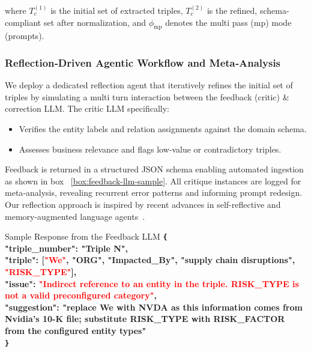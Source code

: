 where $T_c^{(1)}$ is the initial set of extracted triples, $T_c^{(2)}$ is the refined, schema-compliant set after normalization, and $\phi_{\mathrm{mp}}$ denotes the multi pass (mp) mode (prompts).

\subsubsection{Reflection‐Driven Agentic Workflow and Meta‐Analysis}
We deploy a dedicated reflection agent that iteratively refines the initial set of triples by simulating a multi turn interaction between the feedback (critic) \& correction LLM.
The critic LLM specifically: 
\begin{itemize}
  \item Verifies the entity labels and relation assignments against the domain schema.
  \item Assesses business relevance and flags low‐value or contradictory triples.
\end{itemize}
Feedback is returned in a structured JSON schema enabling automated ingestion as shown in box ~\ref{box:feedback-llm-sample}. All critique instances are logged for meta‐analysis, revealing recurrent error patterns and informing prompt redesign. Our reflection approach is inspired by recent advances in self-reflective and memory-augmented language agents~\cite{li2024reflexion,shinn2023reflexion}.\\


\begin{mybox}[label={box:feedback-llm-sample}]{Sample Response from the Feedback LLM}
\footnotesize
\textbf{\texttt{\{}
\\ \hspace{2mm} "triple\_number": "Triple N",
\\ \hspace{2mm} "triple": [\textcolor{red}{"We"}, "ORG", "Impacted\_By", "supply chain disruptions", \textcolor{red}{"RISK\_TYPE"}],
\\ \hspace{2mm} "issue": \textcolor{red}{"Indirect reference to an entity in the triple. RISK\_TYPE is not a valid preconfigured category"},
\\ \hspace{2mm} "suggestion": \textcolor{greenreference}{"replace We with NVDA as this information comes from Nvidia's 10-K file; substitute RISK\_TYPE with RISK\_FACTOR from the configured entity types"}
\\ \texttt{\}}}
\end{mybox}


